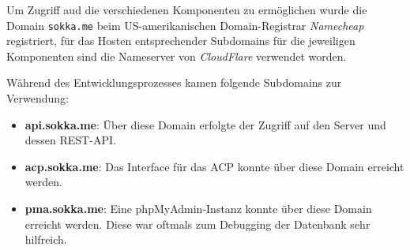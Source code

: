 Um Zugriff aud die verschiedenen Komponenten zu ermöglichen wurde die Domain \lstinline{sokka.me} beim US-amerikanischen Domain-Registrar \textit{Namecheap} registriert, für das Hosten entsprechender Subdomains für die jeweiligen Komponenten sind die Nameserver von \textit{CloudFlare} verwendet worden.

Während des Entwicklungsprozesses kamen folgende Subdomains zur Verwendung:

\begin{itemize}
    \item \textbf{api.sokka.me}: Über diese Domain erfolgte der Zugriff auf den Server und dessen REST-API.
    \item \textbf{acp.sokka.me}: Das Interface für das ACP konnte über diese Domain erreicht werden.
    \item \textbf{pma.sokka.me}: Eine phpMyAdmin-Instanz konnte über diese Domain erreicht werden. Diese war oftmals zum Debugging der Datenbank sehr hilfreich.
\end{itemize}
